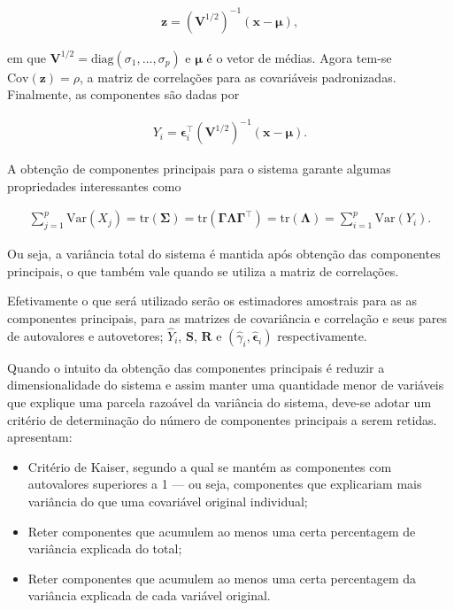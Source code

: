 \documentclass[12pt, a4paper, twoside]{report}
\numberwithin{equation}{subsection} %
\begin{document}
\begin{align}
	\boldsymbol{z} = \left( \boldsymbol{V}^{1/2}\right)^{-1} (\boldsymbol{x} - \boldsymbol{\mu}),
\end{align}

\noindent em que $\boldsymbol{V}^{1/2} = \text{diag}(\sigma_1, \dots, \sigma_p)$ e $\boldsymbol{\mu}$ é o vetor de médias. Agora tem-se $\text{Cov}(\boldsymbol{z}) = \rho$, a matriz de correlações para as covariáveis padronizadas. Finalmente, as componentes são dadas por

\begin{align}
	Y_i = \boldsymbol{\epsilon}_i^\top \left( \boldsymbol{V}^{1/2}\right)^{-1} (\boldsymbol{x} - \boldsymbol{\mu}).
\end{align}

A obtenção de componentes principais para o sistema garante algumas propriedades interessantes como

\begin{align}
	\sum\limits_{j = 1}^{p} \text{Var}\left( X_j \right) = \text{tr} \left( \boldsymbol{\Sigma} \right)  = \text{tr} \left( \boldsymbol{\Gamma \Lambda \Gamma^\top} \right) = \text{tr} \left( \boldsymbol{\Lambda} \right) =  \sum\limits_{i = 1}^{p} \text{Var}\left( Y_i \right).
\end{align}

\noindent Ou seja, a variância total do sistema é mantida após obtenção das componentes principais, o que também vale quando se utiliza a matriz de correlações.   

Efetivamente o que será utilizado serão os estimadores amostrais para as as componentes principais, para as matrizes de covariância e correlação e seus pares de autovalores e autovetores; $\hat{Y}_i$, $\boldsymbol{S}$, $\boldsymbol{R}$ e $(\hat{\gamma}_i, \hat{\boldsymbol{\epsilon}}_i)$ respectivamente.

Quando o intuito da obtenção das componentes principais é reduzir a dimensionalidade do sistema e assim manter uma quantidade menor de variáveis que explique uma parcela razoável da variância do sistema, deve-se adotar um critério de determinação do número de componentes principais a serem retidas. \cite{metodosmultivariados_artes} apresentam:

\begin{itemize}
	\item Critério de Kaiser, segundo a qual se mantém as componentes com autovalores superiores a 1 --- ou seja, componentes que explicariam mais variância do que uma covariável original individual; \\
	\item Reter componentes que acumulem ao menos uma certa percentagem de variância explicada do total; \\
	\item Reter componentes que acumulem ao menos uma certa percentagem da variância explicada de cada variável original.
\end{itemize}
\end{document}
